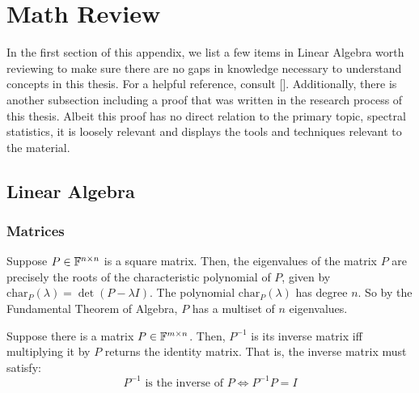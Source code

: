 \chapter{Math Review}

\noindent In the first section of this appendix, we list a few items in Linear Algebra worth reviewing to make sure there are no gaps in knowledge necessary to understand concepts in this thesis.
For a helpful reference, consult [\cite{horn}].
Additionally, there is another subsection including a proof that was written in the research process of this thesis. Albeit this proof has no direct relation to the primary topic, spectral statistics, it is loosely relevant and displays the tools and techniques relevant to the material.

\section{Linear Algebra}
\subsection{Matrices}
\begin{definition}[Eigenvalue]
Suppose $P \in \mathbb{F}^{n \times n}$ is a square matrix. Then, the eigenvalues of the matrix $P$ are precisely the roots of the characteristic polynomial of $P$, given by $\text{char}_P(\lambda) = \det(P - \lambda I)$. The polynomial $\text{char}_P(\lambda)$ has degree $n$. So by the Fundamental Theorem of Algebra, $P$ has a multiset of $n$ eigenvalues.
\end{definition}


\begin{definition}
Suppose there is a matrix $P \in \mathbb{F}^{m\times n}$. Then, $P^{-1}$ is its inverse matrix iff multiplying it by $P$ returns the identity matrix. That is, the inverse matrix must satisfy:
$$ P^{-1} \text{ is the inverse of } P \iff P^{-1} P = I$$
\end{definition}

